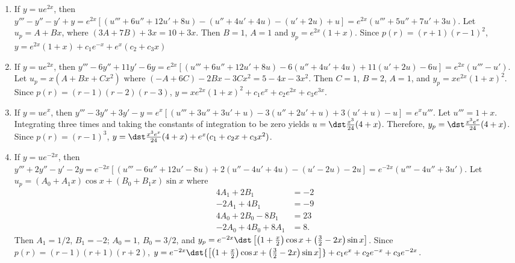 \documentclass[openany]{book}
\newenvironment{sectionSolutions}{
 \begin{enumerate}[item-label={\thesection.\arabic{enumi}.}]
}{
 \end{enumerate}
}
\begin{document}
\begin{sectionSolutions}
\part{b} $y^{(4)}+5y'''+9y''+7y'+2y=-e^{-2x}$.


From the principle of superposition,
 $y_p=x^3(1+x)e^{-x}+xe^{-2x}$.



\item
 If $y=ue^{2x}$, then $y'''-y''-y'+y=e^{2x}[
(u'''+6u''+12u'+8u) -(u''+4u'+4u) -(u'+2u) +u]
=e^{2x}(u'''+5u''+7u'+3u)$. Let $u_p=A+Bx$, where
$(3A+7B)+3x=10+3x$. Then $B=1$,
 $A=1$ and $y_p=e^{2x}(1+x)$. Since $p(r)=(r+1)(r-1)^2$,
 $y=e^{2x}(1+x)+c_1e^{-x}+e^x(c_2+c_3x)$


\item
 If $y=ue^{2x}$, then $y'''-6y''+11y'-6y=e^{2x}[
(u'''+6u''+12u'+8u) -6(u''+4u'+4u) +11(u'+2u) -6u]
=e^{2x}(u'''-u')$. Let $u_p=x(A+Bx+Cx^2)$ where
$(-A+6C)-2Bx-3Cx^2=5-4x-3x^2$. Then $C=1$, $B=2$,
 $A=1$, and $y_p=xe^{2x}(1+x)^2$.
 Since $p(r)=(r-1)(r-2)(r-3)$,
 $y=xe^{2x}(1+x)^2+c_1e^x+c_2e^{2x}+c_3e^{3x}$.


\item
 If $y=ue^x$, then $y'''-3y''+3y'-y=e^x[
(u'''+3u''+3u'+u) -3(u''+2u'+u) +3(u'+u) -u]
=e^xu'''$. Let $u'''=1+x$. Integrating three times and taking
the constants of integration to be zero yields
$u=\dst\frac{x^3}{24}(4+x)$. Therefore,
 $y_p=\dst\frac{x^3e^x}{24}(4+x)$.
 Since $p(r)=(r-1)^3$,
 $y=\dst\frac{x^3e^x}{24}(4+x)
+e^x(c_1+c_2x+c_3x^2)$.



\item
If $y=ue^{-2x}$, then
$y'''+2y''-y'-2y=e^{-2x}[
(u'''-6u''+12u'-8u) +2(u''-4u'+4u) -(u'-2u) -2u]=
e^{-2x}(u'''-4u''+3u')$.
Let $u_p=(A_0+A_1x)\cos x+(B_0+B_1x)\sin x$ where
\begin{align*}
4A_1+2B_1&=-2\phantom{.}\\
-2A_1+4B_1&=-9\phantom{.}\\
4A_0+2B_0-8B_1 &=23\phantom{.}\\
-2A_0+4B_0+8A_1&=8.
\end{align*}
Then $A_1=1/2$, $B_1=-2$; $A_0=1$, $B_0=3/2$, and
 $y_p=e^{-2x}\dst\left[\left(1+\frac{x}{2}\right)\cos
x+\left(\frac{3}{2}-2x\right)\sin x\right]$.
Since $p(r)=(r-1)(r+1)(r+2)$,
 $y=e^{-2x}\dst{\left[\left(1+\frac{x}{2}\right)
\cos x+\left(\frac{3}{2}-2x\right)\sin x\right]}
+c_1e^x+c_2e^{-x}+c_3e^{-2x}$.



\end{sectionSolutions}
\end{document}
